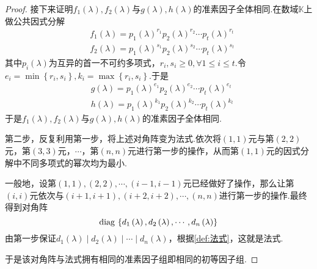 {\begin{proof}
        接下来证明$f_1\left(\lambda\right),f_2\left(\lambda\right)$与$g\left(\lambda\right),h\left(\lambda\right)$的准素因子全体相同.在数域$\mathbb{K}$上做公共因式分解\begin{align*}
             & f_1\left(\lambda\right)=p_1\left(\lambda\right)^{r_1}p_2\left(\lambda\right)^{r_2}\cdots p_t\left(\lambda\right)^{r_t} \\
             & f_2\left(\lambda\right)=p_1\left(\lambda\right)^{s_1}p_2\left(\lambda\right)^{s_2}\cdots p_t\left(\lambda\right)^{s_t}
        \end{align*}其中$p_i\left(\lambda\right)$为互异的首一不可约多项式，$r_i,s_i\geqslant 0,\forall 1\leqslant i\leqslant t.$令$e_i=\min\left\{r_i,s_i\right\},k_i=\max\left\{r_i,s_i\right\}.$于是
        \begin{align*}
             & g\left(\lambda\right)=p_1\left(\lambda\right)^{e_1}p_2\left(\lambda\right)^{e_2}\cdots p_t\left(\lambda\right)^{e_t} \\
             & h\left(\lambda\right)=p_1\left(\lambda\right)^{k_1}p_2\left(\lambda\right)^{k_2}\cdots p_t\left(\lambda\right)^{k_t}
        \end{align*}于是$f_1\left(\lambda\right),f_2\left(\lambda\right)$与$g\left(\lambda\right),h\left(\lambda\right)$的准素因子全体相同.

        第二步，反复利用第一步，将上述对角阵变为法式.依次将$\left(1,1\right)$元与第$\left(2,2\right)$元，第$\left(3,3\right)$元，$\cdots$，第$\left(n,n\right)$元进行第一步的操作，从而第$\left(1,1\right)$元的因式分解中不同多项式的幂次均为最小.

        一般地，设第$\left(1,1\right),\left(2,2\right),\cdots,\left(i-1,i-1\right)$元已经做好了操作，那么让第$\left(i,i\right)$元依次与$\left(i+1,i+1\right),\left(i+2,i+2\right),\cdots,\left(n,n\right)$进行第一步的操作.最终得到对角阵\[
            \operatorname{diag\,} \left\{
            d_1\left(\lambda\right),d_2\left(\lambda\right),\cdots,d_n\left(\lambda\right)
            \right\}
        \]由第一步保证$d_1\left(\lambda\right)\mid d_2\left(\lambda\right)\mid \cdots\mid d_n\left(\lambda\right)$，根据\cref{def:法式}，这就是法式.

        于是该对角阵与法式拥有相同的准素因子组即相同的初等因子组.
    \end{proof}
}
